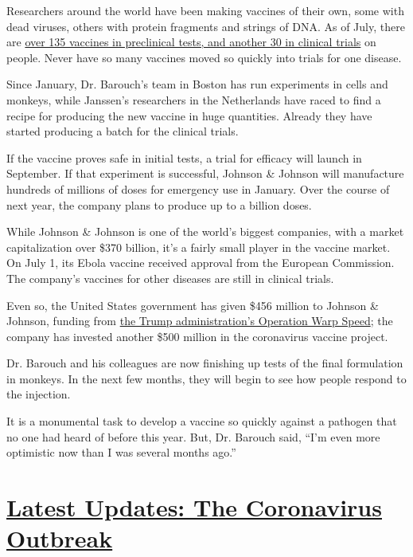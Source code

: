 Researchers around the world have been making vaccines of their own,
some with dead viruses, others with protein fragments and strings of
DNA. As of July, there are
\href{https://www.nytimes3xbfgragh.onion/interactive/2020/science/coronavirus-vaccine-tracker.html}{over
135 vaccines in preclinical tests, and another 30 in clinical trials} on
people. Never have so many vaccines moved so quickly into trials for one
disease.

Since January, Dr. Barouch's team in Boston has run experiments in cells
and monkeys, while Janssen's researchers in the Netherlands have raced
to find a recipe for producing the new vaccine in huge quantities.
Already they have started producing a batch for the clinical trials.

If the vaccine proves safe in initial tests, a trial for efficacy will
launch in September. If that experiment is successful, Johnson \&
Johnson will manufacture hundreds of millions of doses for emergency use
in January. Over the course of next year, the company plans to produce
up to a billion doses.

While Johnson \& Johnson is one of the world's biggest companies, with a
market capitalization over \$370 billion, it's a fairly small player in
the vaccine market. On July 1, its Ebola vaccine received approval from
the European Commission. The company's vaccines for other diseases are
still in clinical trials.

Even so, the United States government has given \$456 million to Johnson
\& Johnson, funding from
\href{https://www.hhs.gov/about/news/2020/06/16/fact-sheet-explaining-operation-warp-speed.html}{the
Trump administration's Operation Warp Speed}; the company has invested
another \$500 million in the coronavirus vaccine project.

Dr. Barouch and his colleagues are now finishing up tests of the final
formulation in monkeys. In the next few months, they will begin to see
how people respond to the injection.

It is a monumental task to develop a vaccine so quickly against a
pathogen that no one had heard of before this year. But, Dr. Barouch
said, ``I'm even more optimistic now than I was several months ago.''

\hypertarget{latest-updates-the-coronavirus-outbreak}{%
\section{\texorpdfstring{\href{https://www.nytimes3xbfgragh.onion/2020/09/04/world/covid-19-coronavirus.html?action=click\&pgtype=Article\&state=default\&region=MAIN_CONTENT_1\&context=storylines_live_updates}{Latest
Updates: The Coronavirus
Outbreak}}{Latest Updates: The Coronavirus Outbreak}}\label{latest-updates-the-coronavirus-outbreak}}

